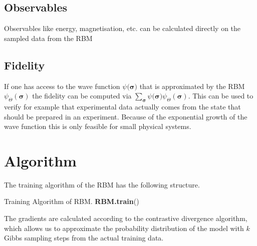 \documentclass[a4paper]{article}
\begin{document}
\subsection{Observables}

Observables like energy, magnetisation, etc. can be calculated directly on the sampled data from the RBM

\subsection{Fidelity}

If one has access to the wave function $\psi(\bm{\sigma)}$ that is approximated by the RBM $\psi_{\Theta}(\bm{\sigma})$ the fidelity can be computed via $\sum_{\bm{\sigma}} \psi(\bm{\sigma)} \psi_{\Theta}(\bm{\sigma})$. This can be used to verify for example that experimental data actually comes from the state that should be prepared in an experiment. Because of the exponential growth of the wave function this is only feasible for small physical systems.


\section{Algorithm}
The training algorithm of the RBM has the following structure.
 
\begin{algorithm}[H]
	 \caption{Training Algorithm of RBM. \textbf{RBM.train}() }
  \SetAlgoLined
 
\end{algorithm}


The gradients are calculated according to the contrastive divergence algorithm, which allows us to approximate the probability distribution of the model with $k$ Gibbs sampling steps from the actual training data.
\end{document}
